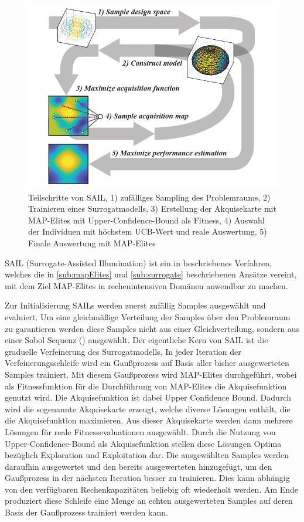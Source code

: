 \begin{figure}[h]
	\centering
	\includegraphics[width=.7\linewidth]{bilder/sail}
	\caption[Teilschritte von SAIL]{Teilschritte von SAIL, 
		1) zufälliges Sampling des Problemraums, 
		2) Trainieren eines Surrogatmodells, 
		3) Erstellung der Akquisekarte mit MAP-Elites mit Upper-Confidence-Bound als Fitness, 
		4) Auswahl der Individuen mit höchstem UCB-Wert und reale Auswertung,
		5) Finale Auswertung mit MAP-Elites
	}
	\label{fig:sail}
\end{figure}

SAIL (Surrogate-Assisted Illumination) ist ein in \cite{Gaier.6152018} beschriebenes Verfahren, welches die in \cref{sub:mapElites} und \cref{sub:surrogate} beschriebenen Ansätze vereint, mit dem Ziel MAP-Elites in rechenintensiven Domänen anwendbar zu machen.

Zur Initialisierung SAILs werden zuerst zufällig Samples ausgewählt und evaluiert.
Um eine gleichmäßige Verteilung der Samples über den Problemraum zu garantieren werden diese Samples nicht aus einer Gleichverteilung, sondern aus einer Sobol Sequenz (\cite{Sobol.1967}) ausgewählt.
Der eigentliche Kern von SAIL ist die graduelle Verfeinerung des Surrogatmodells.
In jeder Iteration der Verfeinerungsschleife wird ein Gaußprozess auf Basis aller bisher ausgewerteten Samples trainiert.
Mit diesem Gaußprozess wird MAP-Elites durchgeführt, wobei als Fitnessfunktion für die Durchführung von MAP-Elites die Akquisefunktion genutzt wird.
Die Akquisefunktion ist dabei Upper Confidence Bound.
Dadurch wird die sogenannte Akquisekarte erzeugt, welche diverse Lösungen enthält, die die Akquisefunktion maximieren.
Aus dieser Akquisekarte werden dann mehrere Lösungen für reale Fitnessevaluationen ausgewählt.
Durch die Nutzung von Upper-Confidence-Bound als Akquisefunktion stellen diese Lösungen Optima bezüglich Exploration und Exploitation dar.
Die ausgewählten Samples werden daraufhin ausgewertet  und den bereits ausgewerteten hinzugefügt, um den Gaußprozess in der nächsten Iteration besser zu trainieren.
Dies kann abhängig von den verfügbaren Rechenkapazitäten beliebig oft wiederholt werden.
Am Ende produziert diese Schleife eine Menge an echten ausgewerteten Samples auf deren Basis der Gaußprozess trainiert werden kann.

